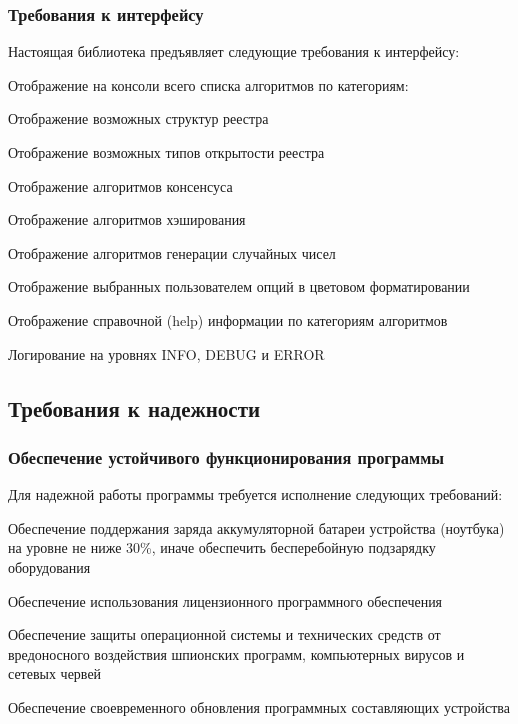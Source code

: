 \subsubsection{Требования к интерфейсу}
Настоящая библиотека предъявляет следующие требования к интерфейсу:
\begin{my_enumerate}
\item Отображение на консоли всего списка алгоритмов по категориям:
    \begin{my_enumerate}
            \item Отображение возможных структур реестра
            \item Отображение возможных типов открытости реестра
            \item Отображение алгоритмов консенсуса
            \item Отображение алгоритмов хэширования
            \item Отображение алгоритмов генерации случайных чисел
    \end{my_enumerate}
\item Отображение выбранных пользователем опций в цветовом форматировании
\item Отображение справочной (help) информации по категориям алгоритмов
\item Логирование на уровнях INFO, DEBUG и ERROR
\end{my_enumerate}

\subsection{Требования к надежности}
\subsubsection{Обеспечение устойчивого функционирования программы}

Для надежной работы программы требуется исполнение следующих требований:
\begin{my_enumerate}
    \item Обеспечение поддержания заряда аккумуляторной батареи устройства
          (ноутбука) на уровне не ниже 30\%, иначе обеспечить бесперебойную
          подзарядку оборудования
    \item Обеспечение использования лицензионного программного обеспечения
    \item Обеспечение защиты операционной системы и технических средств от
          вредоносного воздействия шпионских программ, компьютерных вирусов и
          сетевых червей
    \item Обеспечение своевременного обновления программных составляющих
          устройства
\end{my_enumerate}


